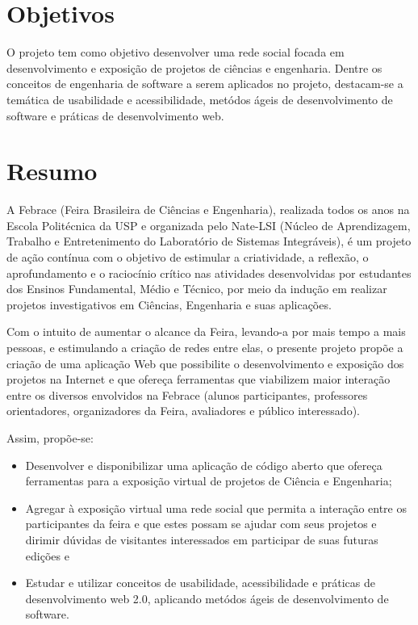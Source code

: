 \documentclass[a4paper,12pt,font=plain,header=plain]{abnt}
\begin{document}
  \setcounter{secnumdepth}{-1}
  \capa

  \renewenvironment{center}{}{}

  \section{Objetivos}
    O projeto tem como objetivo desenvolver uma rede social focada em desenvolvimento e exposição de projetos de ciências e engenharia. Dentre os conceitos de engenharia de software a serem aplicados no projeto, destacam-se a temática de usabilidade e acessibilidade, metódos ágeis de desenvolvimento de software e práticas de desenvolvimento web.

  \section{Resumo}

    A Febrace (Feira Brasileira de Ciências e Engenharia), realizada todos os
    anos na Escola Politécnica da USP e organizada pelo Nate-LSI (Núcleo de
    Aprendizagem, Trabalho e Entretenimento do Laboratório de Sistemas
    Integráveis), é um projeto de ação contínua com o objetivo de estimular a
    criatividade, a reflexão, o aprofundamento e o raciocínio crítico nas
    atividades desenvolvidas por estudantes dos Ensinos Fundamental, Médio e
    Técnico, por meio da indução em realizar projetos investigativos em
    Ciências, Engenharia e suas aplicações.

    Com o intuito de aumentar o alcance da Feira, levando-a por mais tempo a
    mais pessoas, e estimulando a criação de redes entre elas, o presente
    projeto propõe a criação de uma aplicação Web que possibilite o
    desenvolvimento e exposição dos projetos na Internet e que ofereça
    ferramentas que viabilizem maior interação entre os diversos envolvidos na
    Febrace (alunos participantes, professores orientadores, organizadores da
    Feira, avaliadores e público interessado).

    Assim, propõe-se:

    \begin{itemize}
      \item{
        Desenvolver e disponibilizar uma aplicação de código aberto que ofereça ferramentas para a exposição virtual de projetos de Ciência e Engenharia;
      }
      \item{
        Agregar à exposição virtual uma rede social que permita a interação entre os participantes da feira e que estes possam se ajudar com seus projetos e dirimir dúvidas de visitantes interessados em participar de suas futuras edições e
      }
      \item{
        Estudar e utilizar conceitos de usabilidade, acessibilidade e práticas de desenvolvimento web 2.0, aplicando metódos ágeis de desenvolvimento de software.
      }
    \end{itemize}
\end{document}
